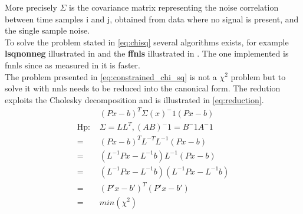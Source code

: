 More precisely $\Sigma$ is the covariance matrix representing the noise correlation between time samples i and j, obtained from data where no signal is present, and the single sample noise.\\
To solve the problem stated in \ref{eq:chisq} several algorithms exists, for example \textbf{lsqnonneg} illustrated in \cite{nnls} and the \textbf{ffnls} illustrated in \cite{fnnls}. The one implemented is fnnls since as measured in \cite{Chen09nonnegativityconstraints} it is faster.\\
The problem presented in \ref{eq:constrained_chi_sq} is not a $\chi^2$ problem but to solve it with nnls needs to be reduced into the canonical form. The redution exploits the Cholesky decomposition and is illustrated in \ref{eq:reduction}.
\begin{equation}\label{eq:reduction}
  \begin{split}
  & (Px-b)^T\Sigma(x)^-1(Px-b)\\
  \text{Hp: }&\Sigma=LL^T, (AB)^-1=B^-1A^-1\\
  =& (Px-b)^T L^{-T} L^{-1} (Px-b)\\
  =& (L^{-1}Px-L^{-1}b)  L^{-1} (Px-b)\\
  =& (L^{-1}Px-L^{-1}b) (L^{-1}Px-L^{-1}b)\\
  =& (P'x-b')^T(P'x-b')\\
  =& min(\chi^2)
  \end{split}
\end{equation}